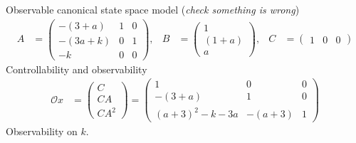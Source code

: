Observable canonical state space model (\emph{check something is wrong})
\begin{align*}
    A &= \begin{pmatrix}
        -\left(3 + a\right) & 1 & 0\\
        -\left(3a + k\right)& 0 & 1\\     
        -k                  & 0 & 0 
    \end{pmatrix},
    & B &= \begin{pmatrix}
        1 \\
        \left(1 + a\right) \\
        a
    \end{pmatrix},
    & C &= \begin{pmatrix}
        1 & 0 & 0
    \end{pmatrix}
\end{align*}
Controllability and observability
\begin{align*}
    \mathcal{O}x &= \begin{pmatrix}
        C \\ CA \\ CA^2
    \end{pmatrix} = \begin{pmatrix}
        1                   & 0 & 0 \\
        -\left(3 + a\right) & 1 & 0 \\
        (a + 3)^2 -k -3a    & -\left(a +3\right) & 1
    \end{pmatrix}
\end{align*}
Observability on $k$.
